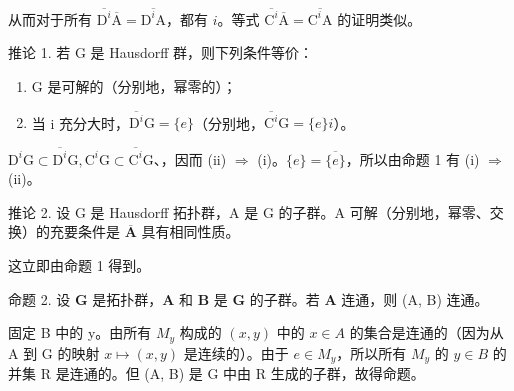 从而对于所有 \(\overline{\mathrm{D}^{i}}\overline{\mathrm{A}} = \overline{\mathrm{D}^{i}\mathrm{A}}\)，都有 \(i\)。等式 \(\overline{\mathrm{C}^{i}}\overline{\mathrm{A}} = \overline{\mathrm{C}^{i}\mathrm{A}}\) 的证明类似。

推论 1. 若 G 是 Hausdorff 群，则下列条件等价：

\begin{enumerate}
\def\labelenumi{(\roman{enumi})}
\item
  G 是可解的（分别地，幂零的）；
\item
  当 i 充分大时，\(\overline{\mathrm{D}^{i}}\mathrm{G} = \{e\}\)（分别地，\(\overline{\mathrm{C}^{i}}\mathrm{G} = \{e\}\)\(i\)）。
\end{enumerate}

\(\mathrm{D}^{i}\mathrm{G} \subset \overline{\mathrm{D}^{i}}\mathrm{G}, \mathrm{C}^{i}\mathrm{G} \subset \overline{\mathrm{C}^{i}}\mathrm{G}\)、，因而 (ii) \(\Rightarrow\) (i)。\(\{e\} = \overline{\{e\}}\)，所以由命题 1 有 (i) \(\Rightarrow\) (ii)。

推论 2. 设 G 是 Hausdorff 拓扑群，A 是 G 的子群。A 可解（分别地，幂零、交换）的充要条件是 \(\overline{\mathbf{A}}\) 具有相同性质。

这立即由命题 1 得到。

命题 2. 设 \(\mathbf{G}\) 是拓扑群，\(\mathbf{A}\) 和 \(\mathbf{B}\) 是 \(\mathbf{G}\) 的子群。若 \(\mathbf{A}\) 连通，则 (A, B) 连通。

固定 B 中的 y。由所有 \(M_{y}\) 构成的 \((x,y)\) 中的 \(x \in A\) 的集合是连通的（因为从 A 到 G 的映射 \(x \mapsto (x,y)\) 是连续的）。由于 \(e \in M_{y}\)，所以所有 \(M_{y}\) 的 \(y \in B\) 的并集 R 是连通的。但 (A, B) 是 G 中由 R 生成的子群，故得命题。

